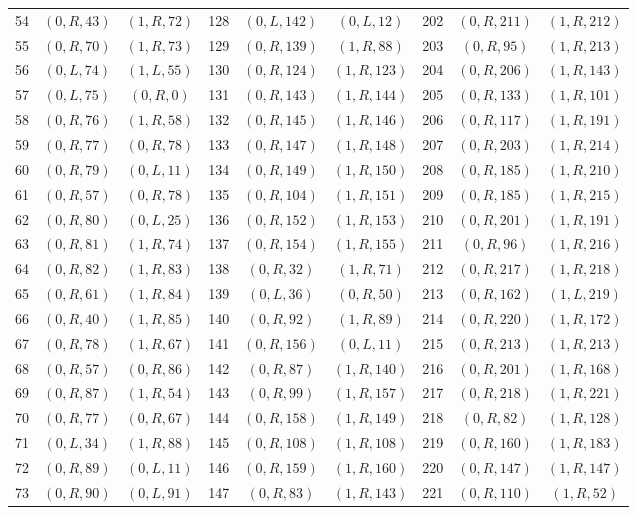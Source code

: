 {\begin{longtable}{rcc@{\qquad}rcc@{\qquad}rcc}
54 & $(0,R,43)$ & $(1,R,72)$ & 128 & $(0,L,142)$ & $(0,L,12)$ & 202 & $(0,R,211)$ & $(1,R,212)$\\
55 & $(0,R,70)$ & $(1,R,73)$ & 129 & $(0,R,139)$ & $(1,R,88)$ & 203 & $(0,R,95)$ & $(1,R,213)$\\
56 & $(0,L,74)$ & $(1,L,55)$ & 130 & $(0,R,124)$ & $(1,R,123)$ & 204 & $(0,R,206)$ & $(1,R,143)$\\
57 & $(0,L,75)$ & $(0,R,0)$ & 131 & $(0,R,143)$ & $(1,R,144)$ & 205 & $(0,R,133)$ & $(1,R,101)$\\
58 & $(0,R,76)$ & $(1,R,58)$ & 132 & $(0,R,145)$ & $(1,R,146)$ & 206 & $(0,R,117)$ & $(1,R,191)$\\
59 & $(0,R,77)$ & $(0,R,78)$ & 133 & $(0,R,147)$ & $(1,R,148)$ & 207 & $(0,R,203)$ & $(1,R,214)$\\
60 & $(0,R,79)$ & $(0,L,11)$ & 134 & $(0,R,149)$ & $(1,R,150)$ & 208 & $(0,R,185)$ & $(1,R,210)$\\
61 & $(0,R,57)$ & $(0,R,78)$ & 135 & $(0,R,104)$ & $(1,R,151)$ & 209 & $(0,R,185)$ & $(1,R,215)$\\
62 & $(0,R,80)$ & $(0,L,25)$ & 136 & $(0,R,152)$ & $(1,R,153)$ & 210 & $(0,R,201)$ & $(1,R,191)$\\
63 & $(0,R,81)$ & $(1,R,74)$ & 137 & $(0,R,154)$ & $(1,R,155)$ & 211 & $(0,R,96)$ & $(1,R,216)$\\
64 & $(0,R,82)$ & $(1,R,83)$ & 138 & $(0,R,32)$ & $(1,R,71)$ & 212 & $(0,R,217)$ & $(1,R,218)$\\
65 & $(0,R,61)$ & $(1,R,84)$ & 139 & $(0,L,36)$ & $(0,R,50)$ & 213 & $(0,R,162)$ & $(1,L,219)$\\
66 & $(0,R,40)$ & $(1,R,85)$ & 140 & $(0,R,92)$ & $(1,R,89)$ & 214 & $(0,R,220)$ & $(1,R,172)$\\
67 & $(0,R,78)$ & $(1,R,67)$ & 141 & $(0,R,156)$ & $(0,L,11)$ & 215 & $(0,R,213)$ & $(1,R,213)$\\
68 & $(0,R,57)$ & $(0,R,86)$ & 142 & $(0,R,87)$ & $(1,R,140)$ & 216 & $(0,R,201)$ & $(1,R,168)$\\
69 & $(0,R,87)$ & $(1,R,54)$ & 143 & $(0,R,99)$ & $(1,R,157)$ & 217 & $(0,R,218)$ & $(1,R,221)$\\
70 & $(0,R,77)$ & $(0,R,67)$ & 144 & $(0,R,158)$ & $(1,R,149)$ & 218 & $(0,R,82)$ & $(1,R,128)$\\
71 & $(0,L,34)$ & $(1,R,88)$ & 145 & $(0,R,108)$ & $(1,R,108)$ & 219 & $(0,R,160)$ & $(1,R,183)$\\
72 & $(0,R,89)$ & $(0,L,11)$ & 146 & $(0,R,159)$ & $(1,R,160)$ & 220 & $(0,R,147)$ & $(1,R,147)$\\
73 & $(0,R,90)$ & $(0,L,91)$ & 147 & $(0,R,83)$ & $(1,R,143)$ & 221 & $(0,R,110)$ & $(1,R,52)$\\
\end{longtable}
}
